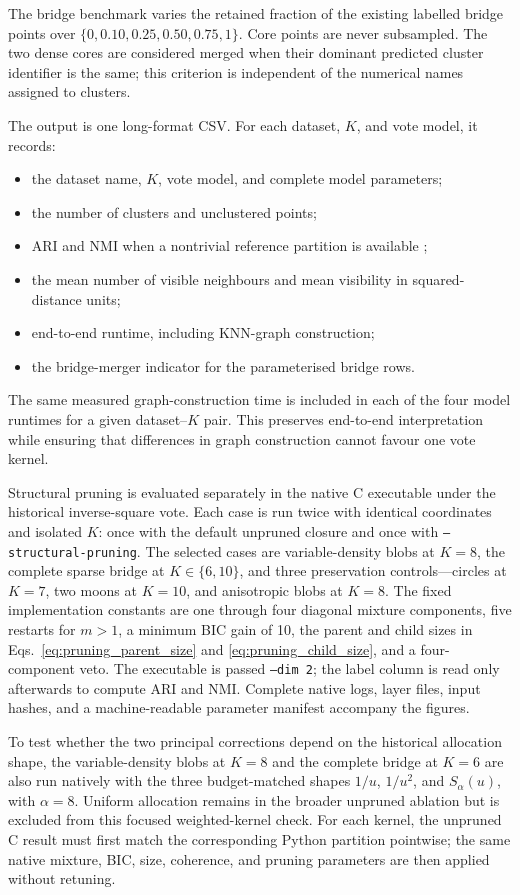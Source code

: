\documentclass[pdflatex,sn-mathphys-num]{sn-jnl}
\begin{document}
The bridge benchmark varies the retained fraction of the existing labelled bridge points over $\{0,0.10,0.25,0.50,0.75,1\}$. Core points are never subsampled. The two dense cores are considered merged when their dominant predicted cluster identifier is the same; this criterion is independent of the numerical names assigned to clusters.

The output is one long-format CSV. For each dataset, $K$, and vote model, it records:
\begin{itemize}
    \item the dataset name, $K$, vote model, and complete model parameters;
    \item the number of clusters and unclustered points;
    \item ARI and NMI when a nontrivial reference partition is available \citep{HubertArabie1985,VinhEppsBailey2010};
    \item the mean number of visible neighbours and mean visibility in squared-distance units;
    \item end-to-end runtime, including KNN-graph construction;
    \item the bridge-merger indicator for the parameterised bridge rows.
\end{itemize}
The same measured graph-construction time is included in each of the four model runtimes for a given dataset--$K$ pair. This preserves end-to-end interpretation while ensuring that differences in graph construction cannot favour one vote kernel.

Structural pruning is evaluated separately in the native C executable under
the historical inverse-square vote.  Each case is run twice with identical
coordinates and isolated $K$: once with the default unpruned closure and once
with \texttt{--structural-pruning}.  The selected cases are variable-density
blobs at $K=8$, the complete sparse bridge at $K\in\{6,10\}$, and three
preservation controls---circles at $K=7$, two moons at $K=10$, and anisotropic
blobs at $K=8$.  The fixed implementation constants are one through four
diagonal mixture components, five restarts for $m>1$, a minimum BIC gain of
10, the parent and child sizes in Eqs.~\eqref{eq:pruning_parent_size} and
\eqref{eq:pruning_child_size}, and a four-component veto.  The executable is
passed \texttt{--dim 2}; the label column is read only afterwards to compute
ARI and NMI.  Complete native logs, layer files, input hashes, and a
machine-readable parameter manifest accompany the figures.

To test whether the two principal corrections depend on the historical allocation shape,
the variable-density blobs at $K=8$ and the complete bridge at $K=6$ are also
run natively with the three budget-matched shapes $1/u$, $1/u^2$, and
$S_\alpha(u)$, with $\alpha=8$.  Uniform allocation remains in the broader
unpruned ablation but is excluded from this focused weighted-kernel check.  For
each kernel, the unpruned C result must first match the corresponding Python
partition pointwise; the same native mixture, BIC, size, coherence, and pruning
parameters are then applied without retuning.
\end{document}
